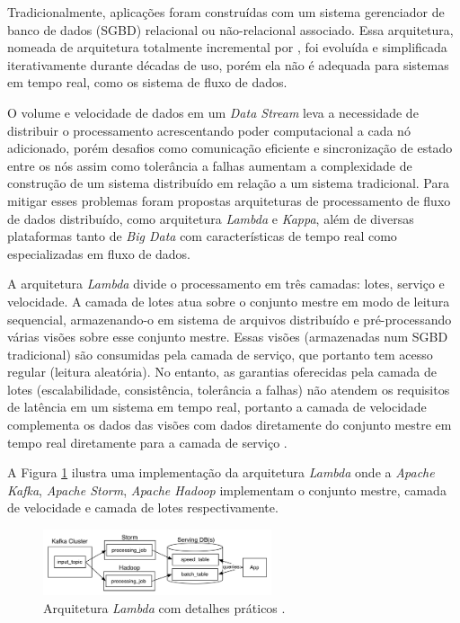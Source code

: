 Tradicionalmente, aplicações foram construídas com um sistema gerenciador de
banco de dados (SGBD) relacional ou não-relacional associado. Essa arquitetura,
nomeada de arquitetura totalmente incremental por ,
foi evoluída e simplificada iterativamente durante décadas de uso, porém ela não
é adequada para sistemas em tempo real, como os sistema de fluxo de dados.



\newcommand{\lambdaa}{\xspace\emph{Lambda}\xspace}
\newcommand{\kappaa}{\xspace\emph{Kappa}\xspace}

O volume e velocidade de dados em um \emph{Data Stream} leva a necessidade de
distribuir o processamento acrescentando poder computacional a cada nó
adicionado, porém desafios como comunicação eficiente e sincronização de estado
entre os nós assim como tolerância a falhas aumentam a complexidade de
construção de um sistema distribuído em relação a um sistema tradicional.
Para mitigar esses problemas foram propostas arquiteturas de processamento de fluxo
de dados distribuído, como arquitetura \lambdaa e \kappaa, além de
diversas plataformas tanto de \emph{Big Data} com características de tempo real
como especializadas em fluxo de dados.


A arquitetura \lambdaa divide o processamento em três camadas: lotes, serviço
e velocidade. A camada de lotes atua sobre o conjunto mestre em modo de leitura
sequencial, armazenando-o em sistema de arquivos distribuído e pré-processando
várias visões sobre esse conjunto mestre. Essas visões (armazenadas num SGBD
tradicional) são consumidas pela camada de serviço, que portanto tem acesso
regular (leitura aleatória).
No entanto, as garantias oferecidas pela camada de
lotes (escalabilidade, consistência, tolerância a falhas) não atendem os requisitos
de latência em um sistema em tempo real, portanto a camada de velocidade
complementa os dados das visões com dados diretamente do conjunto mestre em
tempo real diretamente para a camada de serviço \cite{marz2015big}.

A Figura \ref{fig:lambda} ilustra uma implementação da arquitetura \lambdaa
onde a \emph{Apache Kafka}, \emph{Apache Storm}, \emph{Apache Hadoop}
implementam o conjunto mestre, camada de velocidade e camada de lotes
respectivamente.

\begin{figure}[ht]
\centering
\includegraphics[width=0.6\textwidth]{figuras/lambda.png}
\caption{Arquitetura \lambdaa com detalhes práticos \cite{Kreps2014}.}
\label{fig:lambda}
\end{figure}

